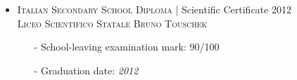 \documentclass[english,10pt,a4paper]{article}
\newcommand{\CompanyName}[1]{\textsc{{\small #1}}}
\newcommand{\JobTimeRange}[1]{{\scriptsize \textcolor{CvColor!50}{\faCalendar*} \hspace{0.01cm} \textcolor{CvIcon}{#1}}}
\begin{document}
\begin{paracol}{2}
\begin{tcolorbox}[colback=white, height=\textheight, colframe=white, left=0cm]
\begin{itemize}
	\vspace*{0.2cm}

	\item \CompanyName{Italian Secondary School Diploma} \textcolor{CvColor}{|} {\scriptsize Scientific Certificate} \hfill \JobTimeRange{2012}\\
	{\scriptsize \textcolor{CvIcon}{\textsc{Liceo Scientifico Statale Bruno Touschek}}} 
	{\scriptsize \begin{itemize}
			\item[-] School-leaving examination mark: \textcolor{CvColor}{90/100}
			\item[-] Graduation date: \textit{2012}
	\end{itemize}}
	
\end{itemize}


\end{tcolorbox}
\end{paracol}
\newpage
\end{document}
